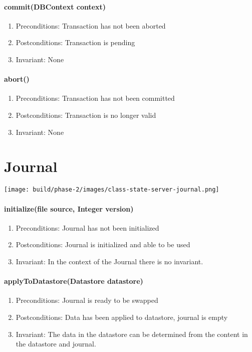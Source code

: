 \documentclass[a4paper]{report}
\begin{document}
	\paragraph{commit(DBContext context)}
		\begin{enumerate}
			\item Preconditions: Transaction has not been aborted
			\item Postconditions: Transaction is pending
			\item Invariant: None
		\end{enumerate}

	

	\paragraph{abort()}
		\begin{enumerate}
			\item Preconditions: Transaction has not been committed
			\item Postconditions: Transaction is no longer valid
			\item Invariant: None
		\end{enumerate}

		\pagebreak

\section{Journal}

	\begin{center}
		\texttt{[image: build/phase-2/images/class-state-server-journal.png]}
	\end{center}

	\paragraph{initialize(file source, Integer version)}
		\begin{enumerate}
			\item Preconditions: Journal has not been initialized
			\item Postconditions: Journal is initialized and able to be used
			\item Invariant: In the context of the Journal there is no invariant.
		\end{enumerate}

	\paragraph{applyToDatastore(Datastore datastore)}
		\begin{enumerate}
			\item Preconditions: Journal is ready to be swapped
			\item Postconditions: Data has been applied to datastore, journal is empty
			\item Invariant: The data in the datastore can be determined from the content in the datastore and journal.
		\end{enumerate}
\end{document}
